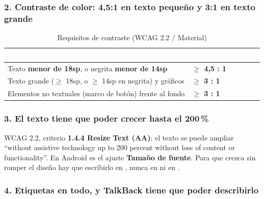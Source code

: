 \subsubsection*{2. Contraste de color: 4,5:1 en texto pequeño y 3:1 en texto grande}

\begin{table}[htbp]
\centering
\small
\begin{tabularx}{\textwidth}{@{}>{\RaggedRight\arraybackslash}p{6cm} >{\RaggedRight\arraybackslash}X@{}}
\toprule
\rowcolor{primary}
\textcolor{white}{\sffamily\bfseries Tipo de texto} & \textcolor{white}{\sffamily\bfseries Contraste mínimo} \\
\midrule
Texto \textbf{menor de 18sp}, o negrita \textbf{menor de 14sp} & \textbf{$\geq$ 4,5 : 1} \\
\rowcolor{soft}
Texto grande ($\geq$ 18sp, o $\geq$ 14sp en negrita) y gráficos & \textbf{$\geq$ 3 : 1} \\
Elementos no textuales (marco de botón) frente al fondo & \textbf{$\geq$ 3 : 1} \\
\bottomrule
\end{tabularx}
\caption{Requisitos de contraste (WCAG 2.2 / Material)}
\end{table}

\subsubsection*{3. El texto tiene que poder crecer hasta el 200\,\%}

WCAG 2.2, criterio \textbf{1.4.4 Resize Text (AA)}: el texto se puede ampliar \enquote{without assistive technology up to 200 percent without loss of content or functionality}. En Android es el ajuste \textbf{Tamaño de fuente}. Para que crezca sin romper el diseño hay que escribirlo en \textbf{}, nunca en  ni en .

\subsubsection*{4. Etiquetas en todo, y TalkBack tiene que poder describirlo}

